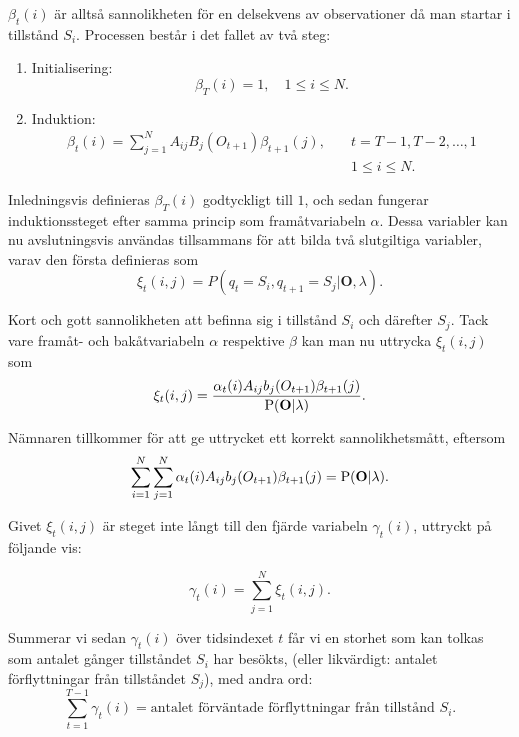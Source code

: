 \documentclass[../rapport_MVEX01-11-05]{subfiles}
\begin{document}
$\beta_t(i)$ är alltså sannolikheten för en delsekvens av
observationer då man startar i tillstånd $S_i$. Processen består i det
fallet av två steg:
\begin{enumerate}
\item Initialisering: 
\begin{equation*}
\beta_T(i) = 1, \quad 1 \leq i \leq N.
\end{equation*}
\item Induktion: 
\begin{align*}
\beta_t(i) = \sum\limits_{j=1}^NA_{ij}B_j(O_{t+1})\beta_{t+1}(j), \quad &t =
T-1,T-2,\dots,1 \\
&1 \leq i \leq N.
\end{align*}
\end{enumerate}  

Inledningsvis definieras $\beta_T(i)$ godtyckligt till $1$, och sedan
fungerar induktionssteget efter samma princip som framåtvariabeln
$\alpha$. Dessa variabler kan nu avslutningsvis användas tillsammans
för att bilda två slutgiltiga variabler, varav den första definieras som 
\begin{equation*}
\xi_t(i,j) = P(q_t = S_i, q_{t+1} = S_j|\textbf{O},\lambda).
\end{equation*}

Kort och gott sannolikheten att befinna sig i tillstånd $S_i$ och
därefter $S_j$. Tack vare framåt- och bakåtvariabeln $\alpha$
respektive $\beta$ kan man nu uttrycka $\xi_t(i,j)$ som
\begin{equation*}
\xi_t(i,j) = \frac{\alpha_t(i)A_{ij}b_j(O_{t+1})\beta_{t+1}(j)}{\mathrm{P}(\textbf{O}|\lambda)}.
\end{equation*} 

Nämnaren tillkommer för att ge uttrycket ett korrekt sannolikhetsmått, eftersom 
\begin{equation*}
\sum_{i=1}^N\sum_{j=1}^N\alpha_t(i)A_{ij}b_j(O_{t+1})\beta_{t+1}(j) = \mathrm{P}(\textbf{O}|\lambda).
\end{equation*}

Givet $\xi_t(i,j)$ är steget inte långt till den fjärde variabeln
$\gamma_t(i)$, uttryckt på följande vis:

\begin{equation*}
\gamma_t(i) = \sum_{j=1}^N\xi_t(i,j).
\end{equation*}

Summerar vi sedan $\gamma_t(i)$ över tidsindexet $t$ får vi en storhet
som kan tolkas som antalet gånger tillståndet $S_i$ har besökts,
(eller likvärdigt: antalet förflyttningar från tillståndet $S_j$), med
andra ord:
\begin{equation*}
\sum_{t=1}^{T-1}\gamma_t(i) = \text{antalet förväntade förflyttningar
  från tillstånd $S_i$.}
\end{equation*} 
\end{document}

